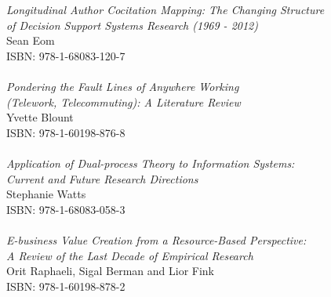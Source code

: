\vspace{12pt}
\noindent \textit{Longitudinal Author Cocitation Mapping: The Changing Structure\\ of Decision Support Systems Research (1969 - 2012)}\\
Sean Eom\\
ISBN: 978-1-68083-120-7\\
\\
\noindent \textit{Pondering the Fault Lines of Anywhere Working\\ (Telework, Telecommuting): A Literature Review}\\
Yvette Blount\\
ISBN: 978-1-60198-876-8\\
\\
\noindent \textit{Application of Dual-process Theory to Information Systems:\\ Current and Future Research Directions}\\
Stephanie Watts\\
ISBN: 978-1-68083-058-3\\
\\
\noindent \textit{E-business Value Creation from a Resource-Based Perspective:\\ 
A Review of the Last Decade of Empirical Research}\\
Orit Raphaeli, Sigal Berman and Lior Fink\\
ISBN: 978-1-60198-878-2\\